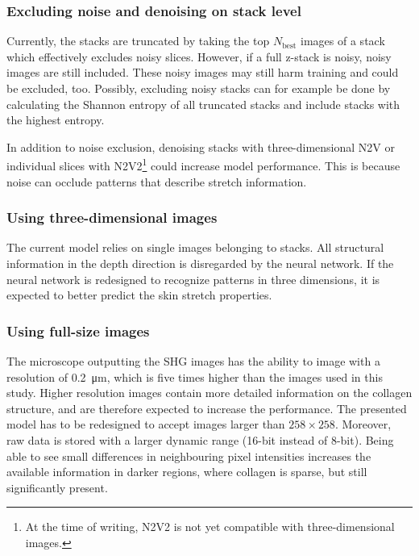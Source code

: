 \subsubsection{Excluding noise and denoising on stack level}
Currently, the stacks are truncated by taking the top $N_\mathrm{best}$ images of a stack which effectively excludes noisy slices.
However, if a full z-stack is noisy, noisy images are still included.
These noisy images may still harm training and could be excluded, too.
Possibly, excluding noisy stacks can for example be done by calculating the Shannon entropy of all truncated stacks and include stacks with the highest entropy.

In addition to noise exclusion, denoising stacks with three-dimensional N2V or individual slices with N2V2\footnote{At the time of writing, N2V2 is not yet compatible with three-dimensional images.} could increase model performance.
This is because noise can occlude patterns that describe stretch information.

\subsubsection{Using three-dimensional images}
The current model relies on single images belonging to stacks.
All structural information in the depth direction is disregarded by the neural network.
If the neural network is redesigned to recognize patterns in three dimensions, it is expected to better predict the skin stretch properties.

\subsubsection{Using full-size images}
The microscope outputting the SHG images has the ability to image with a resolution of \qty{0.2}{\micro\meter}, which is five times higher than the images used in this study.
Higher resolution images contain more detailed information on the collagen structure, and are therefore expected to increase the performance.
The presented model has to be redesigned to accept images larger than $258\times258$.
Moreover, raw data is stored with a larger dynamic range (16-bit instead of 8-bit).
Being able to see small differences in neighbouring pixel intensities increases the available information \eg in darker regions, where collagen is sparse, but still significantly present.

